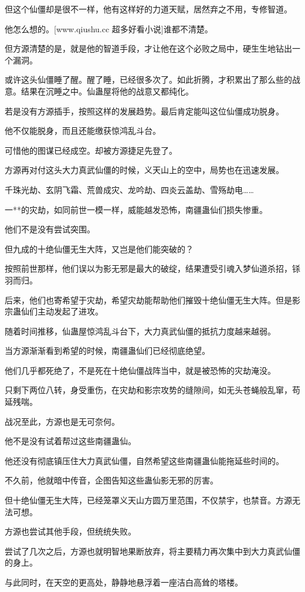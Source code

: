 \begin{this_body}
但这个仙僵却是很不一样，他有这样好的力道天赋，居然弃之不用，专修智道。

他怎么想的。[www.qiushu.cc 超多好看小说]谁都不清楚。

但方源清楚的是，就是他的智道手段，才让他在这个必败之局中，硬生生地钻出一个漏洞。

或许这头仙僵睡了醒。醒了睡，已经很多次了。如此折腾，才积累出了那么些的战意。结果在沉睡之中。仙蛊屋将他的战意又都纯化。

若是没有方源插手，按照这样的发展趋势。最后肯定能叫这位仙僵成功脱身。

他不仅能脱身，而且还能缴获惊鸿乱斗台。

可惜他的图谋已经成空。却被方源捷足先登了。

方源再对付这头大力真武仙僵的时候，义天山上的空中，局势也在迅速发展。

千珠光劫、玄阴飞霜、荒兽成灾、龙吟劫、四炎云盖劫、雪殇劫电……

一**的灾劫，如同前世一模一样，威能越发恐怖，南疆蛊仙们损失惨重。

他们不是没有尝试突围。

但九成的十绝仙僵无生大阵，又岂是他们能突破的？

按照前世那样，他们误以为影无邪是最大的破绽，结果遭受引魂入梦仙道杀招，铩羽而归。

后来，他们也寄希望于灾劫，希望灾劫能帮助他们摧毁十绝仙僵无生大阵。但是影宗蛊仙们主动发起了进攻。

随着时间推移，仙蛊屋惊鸿乱斗台下，大力真武仙僵的抵抗力度越来越弱。

当方源渐渐看到希望的时候，南疆蛊仙们已经彻底绝望。

他们几乎都死绝了，不是死在十绝仙僵战阵当中，就是被恐怖的灾劫淹没。

只剩下两位八转，身受重伤，在灾劫和影宗攻势的缝隙间，如无头苍蝇般乱窜，苟延残喘。

战况至此，方源也是无可奈何。

他不是没有试着帮过这些南疆蛊仙。

他还没有彻底镇压住大力真武仙僵，自然希望这些南疆蛊仙能拖延些时间的。

不久前，他就暗中传音，企图告知这些蛊仙影无邪的厉害。

但十绝仙僵无生大阵，已经笼罩义天山方圆万里范围，不仅禁宇，也禁音。方源无法可想。

方源也尝试其他手段，但统统失败。

尝试了几次之后，方源也就明智地果断放弃，将主要精力再次集中到大力真武仙僵的身上。

与此同时，在天空的更高处，静静地悬浮着一座洁白高耸的塔楼。


\end{this_body}
